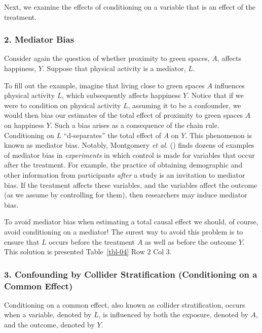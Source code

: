 \documentclass[
  singlecolumn]{article}
\begin{document}
Next, we examine the effects of conditioning on a variable that is an
effect of the treatment.

\subsubsection{2. Mediator Bias}\label{mediator-bias}

Consider again the question of whether proximity to green spaces, \(A\),
affects happiness, \(Y\). Suppose that physical activity is a mediator,
\(L\).

To fill out the example, imagine that living close to green spaces \(A\)
influences physical activity \(L\), which subsequently affects happiness
\(Y\). Notice that if we were to condition on physical activity \(L\),
assuming it to be a confounder, we would then bias our estimates of the
total effect of proximity to green spaces \(A\) on happiness \(Y\). Such
a bias arises as a consequence of the chain rule. Conditioning on \(L\)
``d-separates'' the total effect of \(A\) on \(Y\). This phenomenon is
known as mediator bias. Notably, Montgomery \emph{et al.}
() finds dozens of examples of
mediator bias in \emph{experiments} in which control is made for
variables that occur after the treatment. For example, the practice of
obtaining demographic and other information from participants
\emph{after} a study is an invitation to mediator bias. If the treatment
affects these variables, and the variables affect the outcome (as we
assume by controlling for them), then researchers may induce mediator
bias.

To avoid mediator bias when estimating a total causal effect we should,
of course, avoid conditioning on a mediator! The surest way to avoid
this problem is to ensure that \(L\) occurs before the treatment \(A\)
as well as before the outcome \(Y\). This solution is presented
Table~\ref{tbl-04} Row 2 Col 3.

\subsubsection{3. Confounding by Collider Stratification (Conditioning
on a Common
Effect)}\label{confounding-by-collider-stratification-conditioning-on-a-common-effect}

Conditioning on a common effect, also known as collider stratification,
occurs when a variable, denoted by \(L\), is influenced by both the
exposure, denoted by \(A\), and the outcome, denoted by \(Y\).
\end{document}

